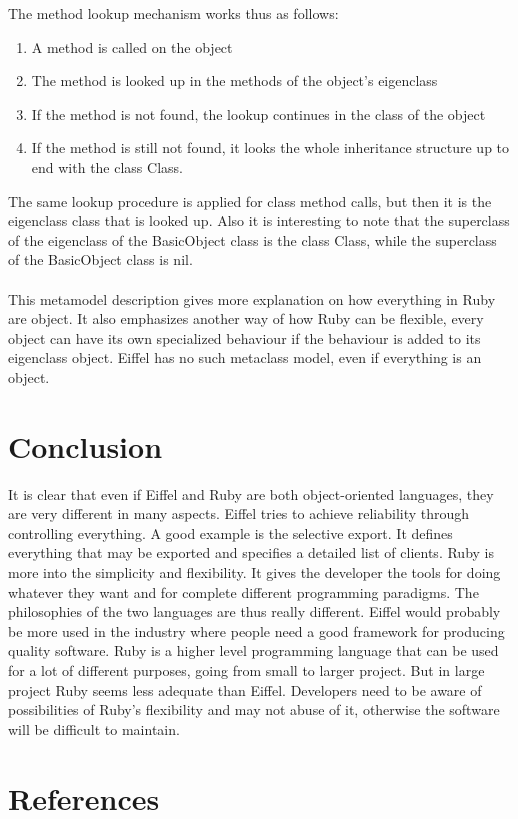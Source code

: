 \documentclass[12pt,a4paper,twocolumn]{article}
\begin{document}
The method lookup mechanism works thus as follows: 
\begin{enumerate}
	\item A method is called on the object
	\item The method is looked up in the methods of the object's eigenclass
	\item If the method is not found, the lookup continues in the class of the object
	\item If the method is still not found, it looks the whole inheritance structure up to end with the class Class. 
\end{enumerate}
The same lookup procedure is applied for class method calls, but then it is the eigenclass class that is looked up. Also it is interesting to note that the superclass of the eigenclass of the BasicObject class is the class Class, while the superclass of the BasicObject class is nil.
\\
\\
This metamodel description gives more explanation on how everything in Ruby are object. It also emphasizes another way of how Ruby can be flexible, every object can have its own specialized behaviour if the behaviour is added to its eigenclass object. Eiffel has no such metaclass model, even if everything is an object.
\section{Conclusion}
It is clear that even if Eiffel and Ruby are both object-oriented languages, they are very different in many aspects. Eiffel tries to achieve reliability through controlling everything. A good example is the selective export. It defines everything that may be exported and specifies a detailed list of clients. Ruby is more into the simplicity and flexibility. It gives the developer the tools for doing whatever they want and for complete different programming paradigms. The philosophies of the two languages are thus really different. Eiffel would probably be more used in the industry where people need a good framework for producing quality software. Ruby is a higher level programming language that can be used for a lot of different purposes, going from small to larger project. But in large project Ruby seems less adequate than Eiffel. Developers need to be aware of possibilities of Ruby's flexibility and may not abuse of it, otherwise the software will be difficult to maintain.
\section{References}


\newpage
\end{document}
